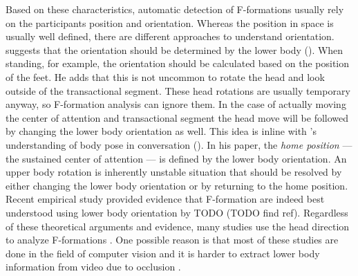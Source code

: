 \documentclass[]{simple-thesis}
\begin{document}
Based on these characteristics, automatic detection of F-formations usually rely on the participants position and orientation.
Whereas the position in space is usually well defined, there are different approaches to understand orientation.
\citeauthor{Kendon1990} suggests that the orientation should be determined by the lower body (\citeyear{Kendon1990}).
When standing, for example, the orientation should be calculated based on the position of the feet.
He adds that this is not uncommon to rotate the head and look outside of the transactional segment.
These head rotations are usually temporary anyway, so F-formation analysis can ignore them.
In the case of actually moving the center of attention and transactional segment the head move will be followed by changing the lower body orientation as well.
This idea is inline with \citeauthor{Schegloff1998}'s understanding of body pose in conversation (\citeyear{Schegloff1998}).
In his paper, the \textit{home position} --- the sustained center of attention --- is defined by the lower body orientation.
An upper body rotation is inherently unstable situation that should be resolved by either changing the lower body orientation or by returning to the home position.
Recent empirical study provided evidence that F-formation are indeed best understood using lower body orientation by TODO (TODO find ref).
Regardless of these theoretical arguments and evidence, many studies use the head direction to analyze F-formations \citep{Cristani2011, Setti2013, Vascon2014}.
One possible reason is that most of these studies are done in the field of computer vision and it is harder to extract lower body information from video due to occlusion \citep{Yasuda2014, Vascon2014}.
\end{document}

